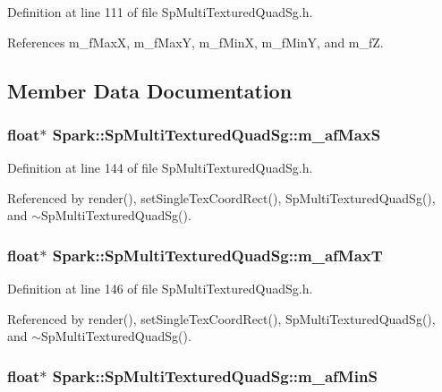 Definition at line 111 of file Sp\-Multi\-Textured\-Quad\-Sg.h.

References m\_\-f\-Max\-X, m\_\-f\-Max\-Y, m\_\-f\-Min\-X, m\_\-f\-Min\-Y, and m\_\-f\-Z.

\subsection{Member Data Documentation}
\subsubsection{\setlength{\rightskip}{0pt plus 5cm}float$\ast$ {\bf Spark::Sp\-Multi\-Textured\-Quad\-Sg::m\_\-af\-Max\-S}\hspace{0.3cm}{\tt  [protected]}}\label{classSpark_1_1SpMultiTexturedQuadSg_p7}


Definition at line 144 of file Sp\-Multi\-Textured\-Quad\-Sg.h.

Referenced by render(), set\-Single\-Tex\-Coord\-Rect(), Sp\-Multi\-Textured\-Quad\-Sg(), and $\sim$Sp\-Multi\-Textured\-Quad\-Sg().
\subsubsection{\setlength{\rightskip}{0pt plus 5cm}float$\ast$ {\bf Spark::Sp\-Multi\-Textured\-Quad\-Sg::m\_\-af\-Max\-T}\hspace{0.3cm}{\tt  [protected]}}\label{classSpark_1_1SpMultiTexturedQuadSg_p9}


Definition at line 146 of file Sp\-Multi\-Textured\-Quad\-Sg.h.

Referenced by render(), set\-Single\-Tex\-Coord\-Rect(), Sp\-Multi\-Textured\-Quad\-Sg(), and $\sim$Sp\-Multi\-Textured\-Quad\-Sg().
\subsubsection{\setlength{\rightskip}{0pt plus 5cm}float$\ast$ {\bf Spark::Sp\-Multi\-Textured\-Quad\-Sg::m\_\-af\-Min\-S}\hspace{0.3cm}{\tt  [protected]}}\label{classSpark_1_1SpMultiTexturedQuadSg_p6}


